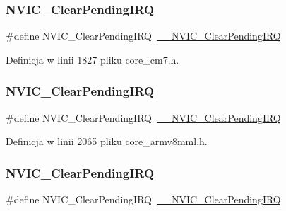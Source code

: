 \subsubsection{\texorpdfstring{N\+V\+I\+C\+\_\+\+Clear\+Pending\+I\+RQ}{NVIC\_ClearPendingIRQ}\hspace{0.1cm}{\footnotesize\ttfamily [10/12]}}
{\footnotesize\ttfamily \#define N\+V\+I\+C\+\_\+\+Clear\+Pending\+I\+RQ~\hyperlink{group___c_m_s_i_s___core___n_v_i_c_functions_ga562a86dbdf14827d0fee8fdafb04d191}{\+\_\+\+\_\+\+N\+V\+I\+C\+\_\+\+Clear\+Pending\+I\+RQ}}



Definicja w linii 1827 pliku core\+\_\+cm7.\+h.

\mbox{\label{group___c_m_s_i_s___core___n_v_i_c_functions_ga590cf113000a079b1f0ea3dcd5b5316c}} 
\subsubsection{\texorpdfstring{N\+V\+I\+C\+\_\+\+Clear\+Pending\+I\+RQ}{NVIC\_ClearPendingIRQ}\hspace{0.1cm}{\footnotesize\ttfamily [11/12]}}
{\footnotesize\ttfamily \#define N\+V\+I\+C\+\_\+\+Clear\+Pending\+I\+RQ~\hyperlink{group___c_m_s_i_s___core___n_v_i_c_functions_ga562a86dbdf14827d0fee8fdafb04d191}{\+\_\+\+\_\+\+N\+V\+I\+C\+\_\+\+Clear\+Pending\+I\+RQ}}



Definicja w linii 2065 pliku core\+\_\+armv8mml.\+h.

\mbox{\label{group___c_m_s_i_s___core___n_v_i_c_functions_ga590cf113000a079b1f0ea3dcd5b5316c}} 
\subsubsection{\texorpdfstring{N\+V\+I\+C\+\_\+\+Clear\+Pending\+I\+RQ}{NVIC\_ClearPendingIRQ}\hspace{0.1cm}{\footnotesize\ttfamily [12/12]}}
{\footnotesize\ttfamily \#define N\+V\+I\+C\+\_\+\+Clear\+Pending\+I\+RQ~\hyperlink{group___c_m_s_i_s___core___n_v_i_c_functions_ga562a86dbdf14827d0fee8fdafb04d191}{\+\_\+\+\_\+\+N\+V\+I\+C\+\_\+\+Clear\+Pending\+I\+RQ}}



